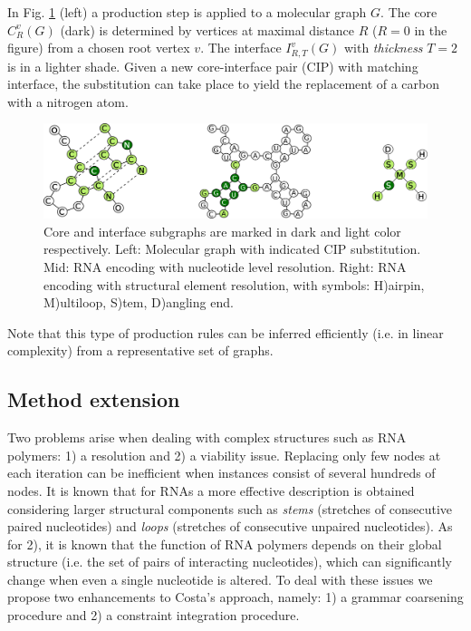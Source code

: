 \documentclass{article}
\begin{document}
In Fig. \ref{allcips} (left) a production step is applied to a molecular graph
$G$. The core $C_{R}^v(G)$ (dark) is determined by vertices at maximal
distance $R$ ($R=0$ in the figure) from a chosen root vertex $v$. The
interface $I_{R,T}^v(G)$ with \emph{thickness} $T=2$ is in a lighter shade.
Given a new core-interface pair (CIP) with matching interface, the
substitution can take place to yield the replacement of a carbon with a
nitrogen atom.

\begin{figure}[ht]
      \centering
        \includegraphics[width=0.7\linewidth]{images/allcipsinone.png}
      \caption{
      Core and interface subgraphs are marked in dark and light color
      respectively. Left: Molecular graph with indicated CIP substitution.
      Mid: RNA encoding with nucleotide level resolution.  Right:  RNA encoding with structural element resolution, with symbols: H)airpin, M)ultiloop, S)tem, D)angling end.}
      \label{allcips}
\end{figure}

Note that this type of production rules can be inferred efficiently (i.e. in
linear complexity) from a representative set of graphs.



\subsection{Method extension}

Two problems arise when dealing with complex structures such as RNA polymers:
1) a resolution and 2) a viability issue. Replacing only few nodes at each
iteration can be inefficient when instances consist of several hundreds of
nodes. It is known that for RNAs a more effective description is obtained
considering larger structural components such as {\em stems} (stretches of
consecutive paired nucleotides) and {\em loops} (stretches of consecutive
unpaired nucleotides). As for 2), it is known that the function of RNA
polymers depends on their global structure (i.e. the set of pairs of
interacting nucleotides), which can significantly change when even a single
nucleotide is altered. To deal with these issues we propose two enhancements
to Costa's approach, namely: 1) a grammar coarsening procedure and
2) a constraint integration procedure.
\end{document}
